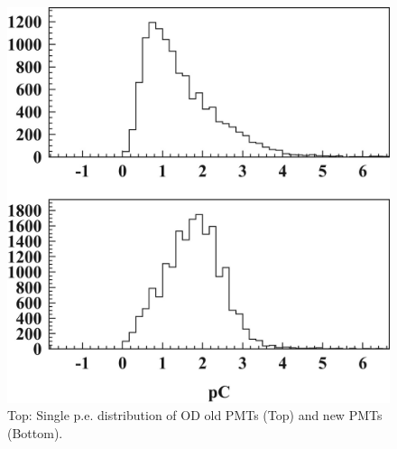 \begin{figure}
\centering
\includegraphics{figures/OD_1pe_distribution.jpg}
\caption{Top: Single p.e. distribution of OD old PMTs (Top) and new PMTs (Bottom).}
\label{fig:od_1pe}
\end{figure}
 